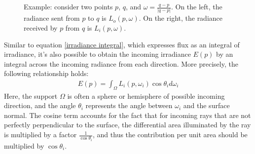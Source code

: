 \begin{figure}[H]
\begin{tikzpicture}[x=0.75pt,y=0.75pt,yscale=-1,xscale=1]
\end{tikzpicture}

\caption{Example: consider two points $p$, $q$, and $\omega=\frac{q-p}{|q-p|}$. On the left, the radiance sent from $p$ to $q$ is $L_o(p,\omega)$. On the right, the radiance received by $p$ from $q$ is $L_i(p,\omega)$.}
\end{figure}
Similar to equation \ref{irradiance integral}, which expresses flux as an integral of irradiance, it's also possible to obtain the incoming irradiance $E(p)$ by an integral across the incoming radiance from each direction. More precisely, the following relationship holds:
\begin{align}
    E(p) = \int_\Omega L_i(p,\omega_i)\cos\theta_id\omega_i
    \label{radiance integral}
\end{align}
Here, the support $\Omega$ is often a sphere or hemisphere of possible incoming direction, and the angle $\theta_i$ represents the angle between $\omega_i$ and the surface normal. The cosine term accounts for the fact that for incoming rays that are not perfectly perpendicular to the surface, the differential area illuminated by the ray is multiplied by a factor $\frac{1}{\cos\theta_i}$, and thus the contribution per unit area should be multiplied by $\cos\theta_i$. 
